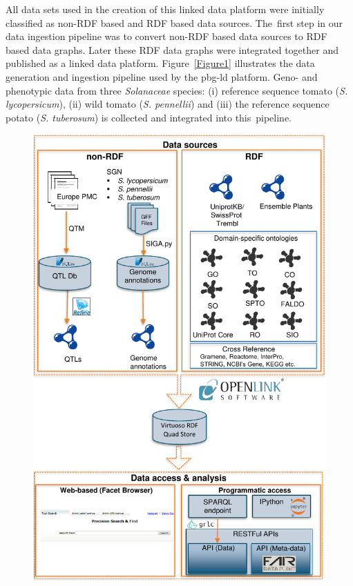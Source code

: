 \documentclass[applsci,article,accept,moreauthors,pdftex]{Definitions/mdpi}
\begin{document}
{{{All data sets used in the creation of this linked data platform were initially classified as non-RDF based and RDF based data sources. The~first step in our data ingestion pipeline was to convert non-RDF based data sources to RDF based data graphs. Later these RDF data graphs were integrated together and published as a linked data platform.}} Figure~\ref{Figure1} illustrates the data generation and ingestion pipeline used by the pbg-ld platform.
Geno- and phenotypic data %
from three \textit{Solanaceae} species: %
(i) reference sequence tomato (\textit{S. lycopersicum}), (ii) wild tomato (\textit{S. pennellii}) and (iii) the reference sequence potato  (\textit{S. tuberosum}) is collected and integrated into this~pipeline.

\begin{figure}[H]
\centering
\includegraphics[scale=.9]{Figure1.pdf}

\end{figure}}
\end{document}
